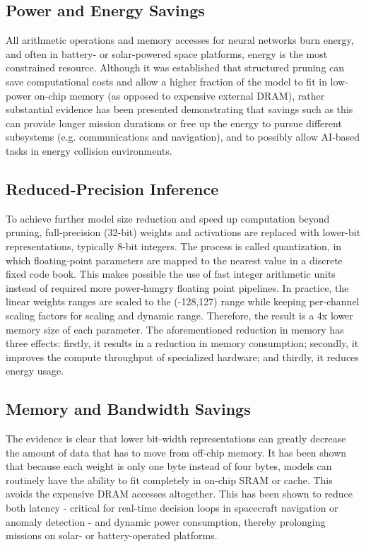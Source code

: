     \subsection{Power and Energy Savings}
    All arithmetic operations and memory accesses for neural networks burn energy, and often in battery- or solar-powered space platforms, energy is the most constrained resource. Although it was established that structured pruning can save computational costs and allow a higher fraction of the model to fit in low-power on-chip memory (as opposed to expensive external DRAM), rather substantial evidence has been presented demonstrating that savings such as this can provide longer mission durations or free up the energy to pursue different subsystems (e.g. communications and navigation), and to possibly allow AI-based tasks in energy collision environments.

    \subsection{Reduced‐Precision Inference}
    To achieve further model size reduction and speed up computation beyond pruning, full-precision (32-bit) weights and activations are replaced with lower-bit representations, typically 8-bit integers. The process is called quantization, in which floating‐point parameters are mapped to the nearest value in a discrete fixed code book. This makes possible the use of fast integer arithmetic units instead of required more power‐hungry floating point pipelines. In practice, the linear weights ranges are scaled to the (-128,127) range while keeping per-channel scaling factors for scaling and dynamic range. Therefore, the result is a 4x lower memory size of each parameter. The aforementioned reduction in memory has three effects: firstly, it results in a reduction in memory consumption; secondly, it improves the compute throughput of specialized hardware; and thirdly, it reduces energy usage.
    
    \subsection{Memory and Bandwidth Savings}
    The evidence is clear that lower bit-width representations can greatly decrease the amount of data that has to move from off-chip memory. It has been shown that because each weight is only one byte instead of four bytes, models can routinely have the ability to fit completely in on-chip SRAM or cache. This avoids the expensive DRAM accesses altogether. This has been shown to reduce both latency - critical for real-time decision loops in spacecraft navigation or anomaly detection - and dynamic power consumption, thereby prolonging missions on solar- or battery-operated platforms.
    
